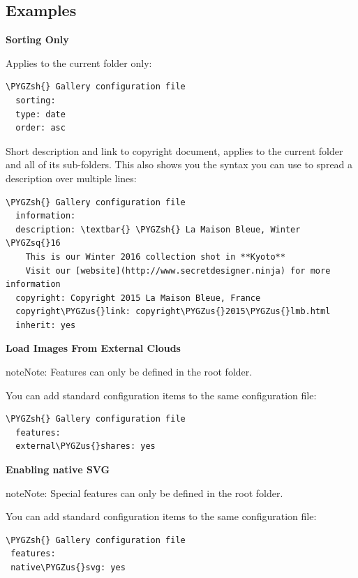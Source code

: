 \documentclass[letterpaper,10pt,english]{sphinxmanual}
\def\PYGZus{\char`\_}
\def\PYGZsh{\char`\#}
\def\PYGZsq{\char`\'}
\renewcommand\PYGZsq{\textquotesingle}
\begin{document}
\subsection{Examples}
\label{files/gallery_app:examples}
\textbf{Sorting Only}

Applies to the current folder only:

\begin{Verbatim}[commandchars=\\\{\}]
\PYGZsh{} Gallery configuration file
  sorting:
  type: date
  order: asc
\end{Verbatim}

Short description and link to copyright document, applies to the current folder
and all of its sub-folders. This also shows you the syntax you can use to
spread a description over multiple lines:

\begin{Verbatim}[commandchars=\\\{\}]
\PYGZsh{} Gallery configuration file
  information:
  description: \textbar{} \PYGZsh{} La Maison Bleue, Winter \PYGZsq{}16
    This is our Winter 2016 collection shot in **Kyoto**
    Visit our [website](http://www.secretdesigner.ninja) for more information
  copyright: Copyright 2015 La Maison Bleue, France
  copyright\PYGZus{}link: copyright\PYGZus{}2015\PYGZus{}lmb.html
  inherit: yes
\end{Verbatim}

\textbf{Load Images From External Clouds}

\begin{notice}{note}{Note:}
Features can only be defined in the root folder.
\end{notice}

You can add standard configuration items to the same configuration file:

\begin{Verbatim}[commandchars=\\\{\}]
\PYGZsh{} Gallery configuration file
  features:
  external\PYGZus{}shares: yes
\end{Verbatim}

\textbf{Enabling native SVG}

\begin{notice}{note}{Note:}
Special features can only be defined in the root folder.
\end{notice}

You can add standard configuration items to the same configuration file:

\begin{Verbatim}[commandchars=\\\{\}]
\PYGZsh{} Gallery configuration file
 features:
 native\PYGZus{}svg: yes
\end{Verbatim}
\end{document}

